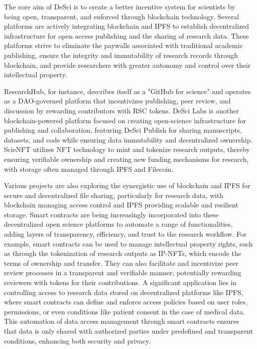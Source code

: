 The core aim of DeSci is to create a better incentive system for scientists by being open, transparent, and enforced through blockchain technology. Several platforms are actively integrating blockchain and IPFS to establish decentralized infrastructure for open access publishing and the sharing of research data. These platforms strive to eliminate the paywalls associated with traditional academic publishing, ensure the integrity and immutability of research records through blockchain, and provide researchers with greater autonomy and control over their intellectual property.

ResearchHub, for instance, describes itself as a "GitHub for science" and operates as a DAO-governed platform that incentivizes publishing, peer review, and discussion by rewarding contributors with RSC tokens. DeSci Labs is another blockchain-powered platform focused on creating open-science infrastructure for publishing and collaboration, featuring DeSci Publish for sharing manuscripts, datasets, and code while ensuring data immutability and decentralized ownership. ScieNFT utilizes NFT technology to mint and tokenize research outputs, thereby ensuring verifiable ownership and creating new funding mechanisms for research, with storage often managed through IPFS and Filecoin.

Various projects are also exploring the synergistic use of blockchain and IPFS for secure and decentralized file sharing, particularly for research data, with blockchain managing access control and IPFS providing scalable and resilient storage. Smart contracts are being increasingly incorporated into these decentralized open science platforms to automate a range of functionalities, adding layers of transparency, efficiency, and trust to the research workflow. For example, smart contracts can be used to manage intellectual property rights, such as through the tokenization of research outputs as IP-NFTs, which encode the terms of ownership and transfer. They can also facilitate and incentivize peer review processes in a transparent and verifiable manner, potentially rewarding reviewers with tokens for their contributions. A significant application lies in controlling access to research data stored on decentralized platforms like IPFS, where smart contracts can define and enforce access policies based on user roles, permissions, or even conditions like patient consent in the case of medical data. This automation of data access management through smart contracts ensures that data is only shared with authorized parties under predefined and transparent conditions, enhancing both security and privacy.

